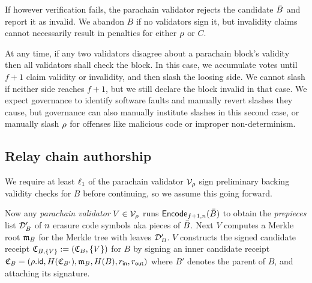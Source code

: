 If however verification fails, the parachain validator rejects the candidate $\bar{B}$ and report it as invalid.  We abandon $B$ if no validators sign it, but invalidity claims cannot necessarily result in penalties for either $\rho$ or $C$.  

At any time, if any two validators disagree about a parachain block's validity then all validators shall check the block.  In this case, we accumulate votes until $f+1$ claim validity or invalidity, and then slash the loosing side.  We cannot slash if neither side reaches $f+1$, but we still declare the block invalid in that case.  We expect governance to identify software faults and manually revert slashes they cause, but governance can also manually institute slashes in this second case, or manually slash $\rho$ for offenses like malicious code or improper non-determinism. 


\subsection{Relay chain authorship} %


We require at least $\ell_1$ of the parachain validator $\mathcal{V}_{\rho}$ sign preliminary backing validity checks for $B$ before continuing, so we assume this going forward.

Now any {\em parachain validator} $V \in \mathcal{V}_{\rho}$ runs $\mathsf{Encode}_{f+1,n}(\bar{B})$ to obtain the {\em prepieces} list $\mathcal{D}'_B$ of $n$ erasure code symbols aka pieces of $\bar{B}$.  Next $V$ computes a Merkle root $\mathfrak{m}_B$ for the Merkle tree with leaves $\mathcal{D}'_B$.  $V$ constructs the signed candidate receipt $\mathfrak{C}_{B,\{V\}} := (\mathfrak{C}_{B},\{V\})$ for $B$ by signing an inner candidate receipt $\mathfrak{C}_B = (\rho.\mathsf{id},H(\mathfrak{C}_{B'}),\mathfrak{m}_B,H(B),r_{\mathsf{in}},r_{\mathsf{out}})$ where $B'$ denotes the parent of $B$, and attaching its signature.  

